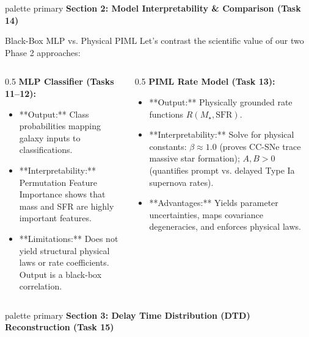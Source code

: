 \documentclass[9pt]{beamer}
\begin{document}
\begin{frame}[plain]
  \vfill
  \centering
  \begin{beamercolorbox}[sep=8pt,center,shadow=true,rounded=true]{palette primary}
    \textbf{Section 2: Model Interpretability \& Comparison (Task 14)}
  \end{beamercolorbox}
  \vfill
\end{frame}

\begin{frame}{Black-Box MLP vs. Physical PIML}
  Let's contrast the scientific value of our two Phase 2 approaches:
  \begin{columns}
    \begin{column}{0.5\textwidth}
      \alert{\textbf{MLP Classifier (Tasks 11--12):}}
      \begin{itemize}
        \item **Output:** Class probabilities mapping galaxy inputs to classifications.
        \item **Interpretability:** Permutation Feature Importance shows that mass and SFR are highly important features.
        \item **Limitations:** Does not yield structural physical laws or rate coefficients. Output is a black-box correlation.
      \end{itemize}
    \end{column}
    \begin{column}{0.5\textwidth}
      \alert{\textbf{PIML Rate Model (Task 13):}}
      \begin{itemize}
        \item **Output:** Physically grounded rate functions $R(M_\star, \text{SFR})$.
        \item **Interpretability:** Solve for physical constants: $\beta \approx 1.0$ (proves CC-SNe trace massive star formation); $A, B > 0$ (quantifies prompt vs. delayed Type Ia supernova rates).
        \item **Advantages:** Yields parameter uncertainties, maps covariance degeneracies, and enforces physical laws.
      \end{itemize}
    \end{column}
  \end{columns}
\end{frame}

\begin{frame}[plain]
  \vfill
  \centering
  \begin{beamercolorbox}[sep=8pt,center,shadow=true,rounded=true]{palette primary}
    \textbf{Section 3: Delay Time Distribution (DTD) Reconstruction (Task 15)}
  \end{beamercolorbox}
  \vfill
\end{frame}
\end{document}
